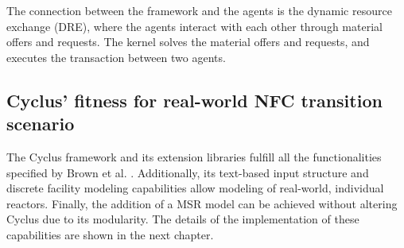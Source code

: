 The connection between the framework and the agents is
the dynamic resource exchange (DRE), where the agents
interact with each other through material offers and requests.
The kernel solves the material offers and requests, and executes
the transaction between two agents.

\subsection{Cyclus' fitness for real-world \gls{NFC} transition scenario}
The Cyclus framework and its extension libraries fulfill all the functionalities
specified by Brown et al. \cite{brown_identification_2016}.  Additionally,
its text-based input structure and discrete facility modeling capabilities
allow modeling of real-world, individual reactors. Finally, 
the addition of a \gls{MSR} model can be achieved without altering
Cyclus due to its modularity. The details of the implementation
of these capabilities are shown in the next chapter.


